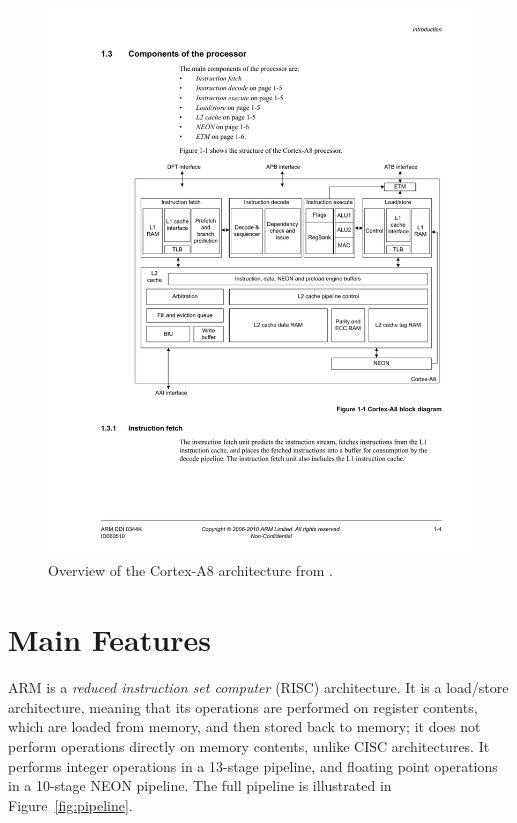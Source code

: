 \documentclass[oneside,a4paper]{report}
\begin{document}
\begin{figure}[htbp]
	\centering
	\includegraphics[width=1.0\textwidth]{./fig/CortexA8.pdf}
	\caption{Overview of the Cortex-A8 architecture from \cite[p. 1-4]{A8Ref}.}
	\label{fig:cortexa8}
\end{figure}

\chapter{Main Features}

ARM is a \emph{reduced instruction set computer} (RISC) architecture. It is a load/store architecture, meaning that its operations are performed on register contents, which are loaded from memory, and then stored back to memory; it does not perform operations directly on memory contents, unlike CISC architectures. It performs integer operations in a 13-stage pipeline, and floating point operations in a 10-stage NEON pipeline. The full pipeline is illustrated in Figure~\ref{fig:pipeline}.
\end{document}
